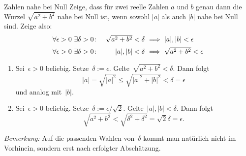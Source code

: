 \documentclass{algblatt}
\begin{document}
\begin{aufgabe}{Zahlen nahe bei Null}
Zeige, dass für zwei reelle Zahlen $a$ und $b$ genau dann die Wurzel
$\sqrt{a^2 + b^2}$ nahe bei Null ist, wenn sowohl $|a|$ als auch $|b|$
nahe bei Null sind. Zeige also:
\[ \begin{array}{@{}rr@{\ }c@{\ }l@{}}
  \forall \epsilon > 0\ \exists \delta > 0 \colon &
        \sqrt{a^2 + b^2} < \delta & \implies & |a|, |b| < \epsilon \\[0.5em]
    \forall \epsilon > 0\ \exists \delta > 0 \colon &
        |a|, |b| < \delta & \implies & \sqrt{a^2  + b^2} < \epsilon
\end{array} \]
\vspace{-1.0em}
\begin{loesung}
\begin{enumerate}
\item Sei~$\epsilon > 0$ beliebig. Setze~$\delta := \epsilon$. Gelte~$\sqrt{a^2
+ b^2} < \delta$. Dann folgt
\[ |a| = \sqrt{|a|^2} \leq \sqrt{|a|^2 + |b|^2} < \delta = \epsilon \]
und analog mit~$|b|$.
\item Sei~$\epsilon > 0$ beliebig. Setze~$\delta := \epsilon/\sqrt{2}$.
Gelte~$|a|,|b| < \delta$. Dann folgt
\[ \sqrt{a^2 + b^2} < \sqrt{\delta^2 + \delta^2} = \sqrt{2} \delta = \epsilon. \]
\end{enumerate}
\emph{Bemerkung:} Auf die passenden Wahlen von~$\delta$ kommt man natürlich
nicht im Vorhinein, sondern erst nach erfolgter Abschätzung.
\end{loesung}
\end{aufgabe}
\end{document}

